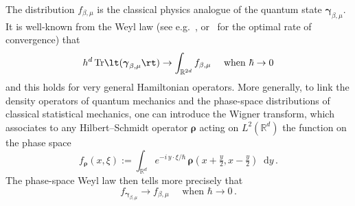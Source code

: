 \documentclass[11pt]{amsart}
\theoremstyle{plain}
\theoremstyle{definition}
\newcommand		{\RR}		{\mathbb R}			%
\newcommand		{\R}		{\RR}
\newcommand		{\Rd}		{\R^d}
\newcommand		{\Rdd}		{\R^{2d}}
\renewcommand	{\(}			{\lt(}
\renewcommand	{\)}			{\rt)}
\renewcommand		{\d}		{\mathop{}\!\mathrm{d}}		%
\DeclareMathOperator{\tr}		{Tr}				%
\newcommand		{\Tr}[1]		{\tr\!\( #1 \)}		%
\newcommand		{\intd}			{\int_{\Rd}}
\newcommand		{\intdd}		{\int_{\Rdd}}
\newcommand		{\hd}		{h^d}
\newcommand		{\op}		{{\boldsymbol{\rho}}}%
\newcommand		{\opgam}	{{\boldsymbol{\gamma}}}	%
\begin{document}
	The distribution $f_{\beta,\mu}$ is the classical physics analogue of the quantum state $\opgam_{\beta, \mu}$. It is well-known from the Weyl law (see e.g.~\cite{berezin_wick_1971, shubin_pseudodifferential_2001}, or~\cite{robert_comportement_1981} for the optimal rate of convergence) that
	\begin{equation*}
		\hd \Tr{\opgam_{\beta,\mu}} \to \intdd f_{\beta,\mu} \quad \text{ when } \hbar\to 0
	\end{equation*}
	and this holds for very general Hamiltonian operators. More generally, to link the density operators of quantum mechanics and the phase-space distributions of classical statistical mechanics, one can introduce the Wigner transform, which associates to any Hilbert--Schmidt operator $\op$ acting on $L^2(\Rd)$ the function on the phase space
	\begin{equation*}
		f_{\op}(x,\xi) := \intd e^{-i\,y\cdot\xi/\hbar} \,\op(x+\tfrac{y}{2},x-\tfrac{y}{2})\d y \, .
	\end{equation*}
	The phase-space Weyl law then tells more precisely that
	\begin{equation*}
		f_{\opgam_{\beta,\mu}} \to f_{\beta,\mu} \quad \text{ when } \hbar\to 0 \, .
	\end{equation*}
	
\end{document}
